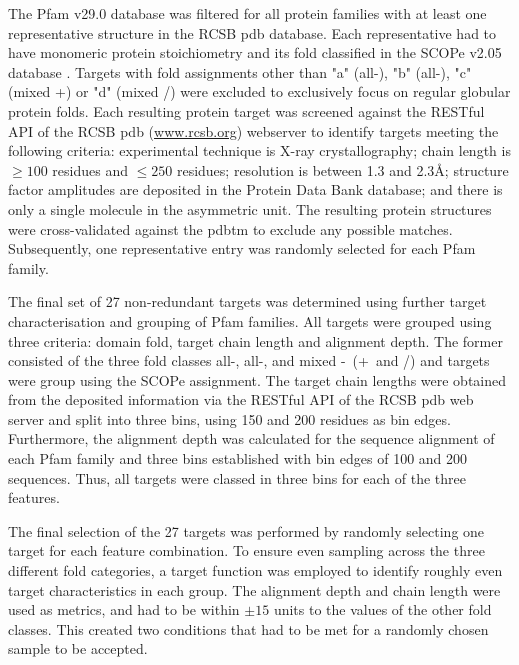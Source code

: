The Pfam v29.0 \cite{Finn2016-zo} database was filtered for all protein families with at least one representative structure in the RCSB \gls{pdb} \cite{Berman2000-ua} database. Each representative had to have monomeric protein stoichiometry and its fold classified in the SCOPe v2.05 database \cite{Chandonia2017-vf}. Targets with fold assignments other than "a" (all-\textalpha), "b" (all-\textbeta), "c" (mixed \textalpha+\textbeta) or "d" (mixed \textalpha/\textbeta) were excluded to exclusively focus on regular globular protein folds. Each resulting protein target was screened against the RESTful API of the RCSB \gls{pdb} (\url{www.rcsb.org}) webserver to identify targets meeting the following criteria: experimental technique is X-ray crystallography; chain length is $\geq100$ residues and $\leq250$ residues; resolution is between 1.3 and 2.3\AA; structure factor amplitudes are deposited in the Protein Data Bank \cite{Berman2000-ua} database; and there is only a single molecule in the asymmetric unit. The resulting protein structures were cross-validated against the \gls{pdbtm} \cite{Tusnady2005-ns} to exclude any possible matches. Subsequently, one representative entry was randomly selected for each Pfam family.

The final set of 27 non-redundant targets was determined using further target characterisation and grouping of Pfam families. All targets were grouped using three criteria: domain fold, target chain length and alignment depth. The former consisted of the three fold classes all-\textalpha, all-\textbeta, and mixed \textalpha-\textbeta\ (\textalpha+\textbeta\ and \textalpha/\textbeta) and targets were group using the SCOPe assignment. The target chain lengths were obtained from the deposited information via the RESTful API of the RCSB \gls{pdb} web server and split into three bins, using 150 and 200 residues as bin edges. Furthermore, the alignment depth was calculated for the sequence alignment of each Pfam family and three bins established with bin edges of 100 and 200 sequences. Thus, all targets were classed in three bins for each of the three features. 

The final selection of the 27 targets was performed by randomly selecting one target for each feature combination. To ensure even sampling across the three different fold categories, a target function was employed to identify roughly even target characteristics in each group. The alignment depth and chain length were used as metrics, and had to be within $\pm15$ units to the values of the other fold classes. This created two conditions that had to be met for a randomly chosen sample to be accepted.

